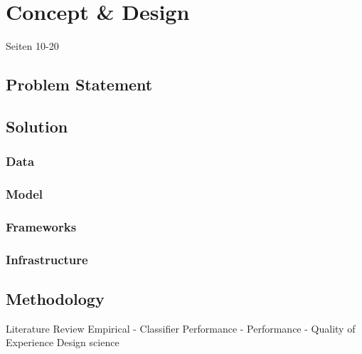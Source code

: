 \chapter{Concept \& Design}

Seiten 10-20
\section{Problem Statement}
\section{Solution}
\subsection{Data}
\subsection{Model}
\subsection{Frameworks}
\subsection{Infrastructure}
\section{Methodology}
Literature Review
Empirical
- Classifier Performance
- Performance
- Quality of Experience
Design science






